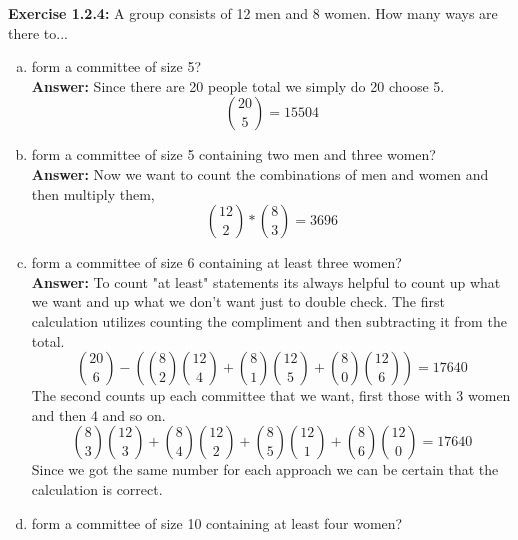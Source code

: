 \documentclass{amsart}
\begin{document}
\noindent\textbf{Exercise 1.2.4: } A group consists of 12 men and 8 women. How many ways are there to...\\
\begin{enumerate}[(a)]
\item form a committee of size 5?\\

\noindent \textbf{Answer:}
Since there are 20 people total we simply do 20 choose 5.
\begin{equation}
{{20} \choose {5}}=15504
\end{equation}
\vspace{1in}

\item form a committee of size 5 containing two men and three women?\\

\noindent \textbf{Answer:}
Now we want to count the combinations of men and women and then multiply them, 
\begin{equation}
{{12} \choose {2}}*{{8} \choose {3}}=3696
\end{equation}

\vspace{1in}

\item form a committee of size 6 containing at least three women?\\

\noindent \textbf{Answer:}
To count "at least" statements its always helpful to count up what we want and up what we don't want just to double check.
The first calculation utilizes counting the compliment and then subtracting it from the total.
\begin{equation}
{{20} \choose {6}}-({{8} \choose {2}}{{12} \choose {4}}+{{8} \choose {1}}{{12} \choose {5}}+{{8} \choose {0}}{{12} \choose {6}})=17640
\end{equation}
The second counts up each committee that we want, first those with 3 women and then 4 and so on.
\begin{equation}
{{8} \choose {3}}{{12} \choose {3}}+{{8} \choose {4}}{{12} \choose {2}}+{{8} \choose {5}}{{12} \choose {1}}+{{8} \choose {6}}{{12} \choose {0}}=17640
\end{equation}
Since we got the same number for each approach we can be certain that the calculation is correct.
\vspace{1in}

\item form a committee of size 10 containing at least four women?\\



\end{enumerate}
\end{document}
